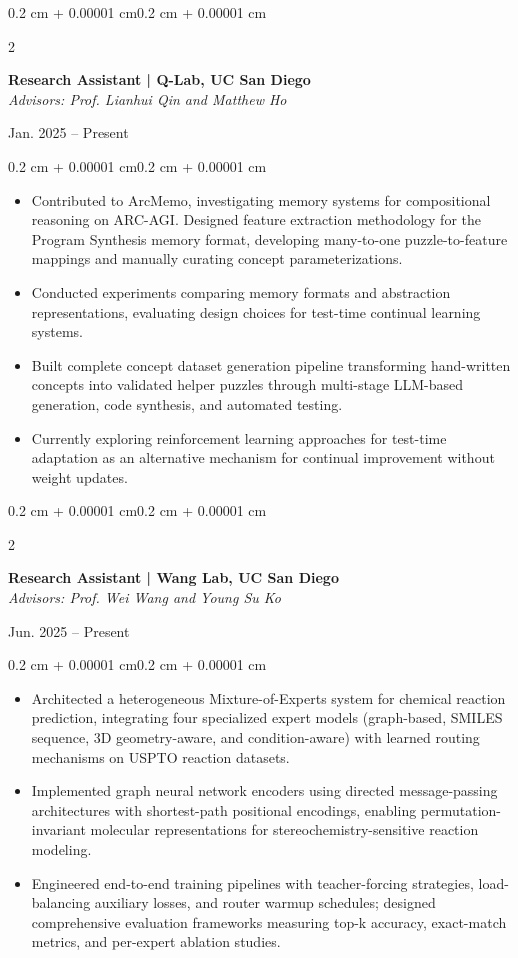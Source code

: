 \documentclass[10pt, letterpaper]{article}
\newenvironment{highlights}{
    \begin{itemize}[
        topsep=0.10 cm,
        parsep=0.10 cm,
        partopsep=0pt,
        itemsep=0pt,
        leftmargin=0.4 cm + 10pt
    ]
}{\end{itemize}}
\newenvironment{onecolentry}{
    \begin{adjustwidth}{0.2 cm + 0.00001 cm}{0.2 cm + 0.00001 cm}
}{\end{adjustwidth}}
\newenvironment{twocolentry}[2][]{
    \onecolentry
    \def\secondColumn{#2}
    \setcolumnwidth{\fill, 4.5 cm}
    \begin{paracol}{2}
}{
    \switchcolumn \raggedleft \secondColumn
    \end{paracol}
    \endonecolentry
}
\begin{document}
\begin{twocolentry}{Jan. 2025 -- Present}
    \textbf{Research Assistant | Q-Lab, UC San Diego}\\
    \textit{Advisors: Prof. Lianhui Qin and Matthew Ho}
\end{twocolentry}
\vspace{0.10 cm}
\begin{onecolentry}
    \begin{highlights}
        \item Contributed to ArcMemo, investigating memory systems for compositional reasoning on ARC-AGI. Designed feature extraction methodology for the Program Synthesis memory format, developing many-to-one puzzle-to-feature mappings and manually curating concept parameterizations.
        \item Conducted experiments comparing memory formats and abstraction representations, evaluating design choices for test-time continual learning systems.
        \item Built complete concept dataset generation pipeline transforming hand-written concepts into validated helper puzzles through multi-stage LLM-based generation, code synthesis, and automated testing.
        \item Currently exploring reinforcement learning approaches for test-time adaptation as an alternative mechanism for continual improvement without weight updates.
    \end{highlights}
\end{onecolentry}
\vspace{0.20 cm}

\begin{twocolentry}{Jun. 2025 -- Present}
    \textbf{Research Assistant | Wang Lab, UC San Diego}\\
    \textit{Advisors: Prof. Wei Wang and Young Su Ko}
\end{twocolentry}
\vspace{0.10 cm}
\begin{onecolentry}
    \begin{highlights}
        \item Architected a heterogeneous Mixture-of-Experts system for chemical reaction prediction, integrating four specialized expert models (graph-based, SMILES sequence, 3D geometry-aware, and condition-aware) with learned routing mechanisms on USPTO reaction datasets.
        \item Implemented graph neural network encoders using directed message-passing architectures with shortest-path positional encodings, enabling permutation-invariant molecular representations for stereochemistry-sensitive reaction modeling.
        \item Engineered end-to-end training pipelines with teacher-forcing strategies, load-balancing auxiliary losses, and router warmup schedules; designed comprehensive evaluation frameworks measuring top-k accuracy, exact-match metrics, and per-expert ablation studies.
    \end{highlights}
\end{onecolentry}
\vspace{0.20 cm}
\end{document}

